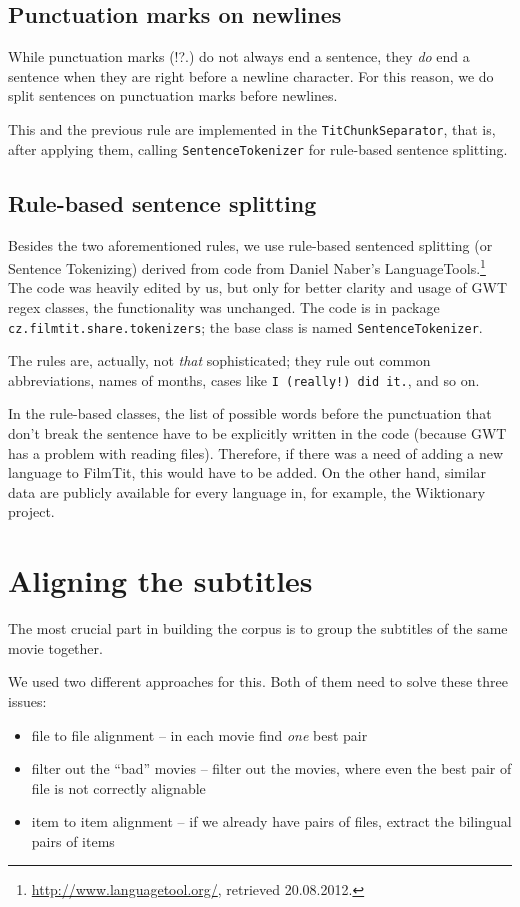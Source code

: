 \subsection*{Punctuation marks on newlines}
While punctuation marks (!?.) do not always end a sentence, they \emph{do} end a sentence when they are right before a newline character. For this reason, we do split sentences on punctuation marks before newlines.

This and the previous rule are implemented in the \texttt{TitChunkSeparator}, that is, after applying them, calling \texttt{SentenceTokenizer} for rule-based sentence splitting.

\subsection*{Rule-based sentence splitting}
Besides the two aforementioned rules, we use rule-based sentenced splitting (or Sentence Tokenizing) derived from code from Daniel Naber's LanguageTools.\footnote{\url{http://www.languagetool.org/}, retrieved 20.08.2012.} The code was heavily edited by us, but only for better clarity and usage of GWT regex classes, the functionality was unchanged. The code is in package \texttt{cz.filmtit.share.tokenizers}; the base class is named \texttt{SentenceTokenizer}.

The rules are, actually, not \emph{that} sophisticated; they rule out common abbreviations, names of months, cases like \texttt{I (really!) did it.}, and so on.

In the rule-based classes, the list of possible words before the punctuation that don't break the sentence have to be explicitly written in the code (because GWT has a problem with reading files). Therefore, if there was a need of adding a new language to FilmTit, this would have to be added. On the other hand, similar data are publicly available for every language in, for example, the Wiktionary project.

\section{Aligning the subtitles}
\label{sec:aligning_subtitles}
The most crucial part in building the corpus is to group the subtitles of the same movie together.

We used two different approaches for this. Both of them need to solve these three issues:
\begin{itemize}
    \item file to file alignment -- in each movie find \emph{one} best pair
    \item filter out the ``bad'' movies -- filter out the movies, where even the best pair of file is not correctly alignable
    \item item to item alignment -- if we already have pairs of files, extract the bilingual pairs of items 
\end{itemize}


